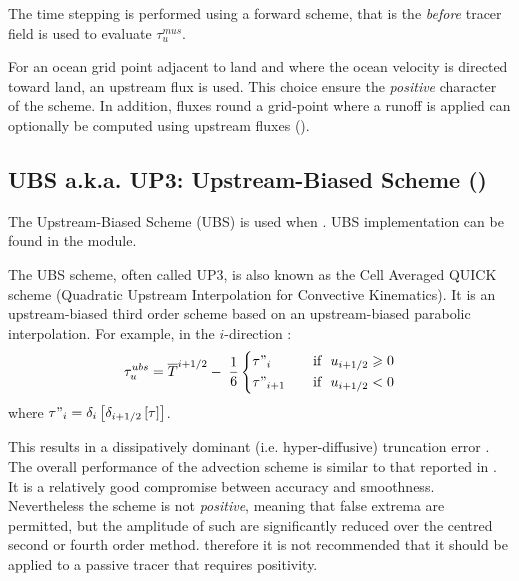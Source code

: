 \documentclass[../tex_main/NEMO_manual]{subfiles}
\begin{document}
The time stepping is performed using a forward scheme, that is the \textit{before} 
tracer field is used to evaluate $\tau _u^{mus}$.

For an ocean grid point adjacent to land and where the ocean velocity is 
directed toward land, an upstream flux is used. This choice ensure 
the \textit{positive} character of the scheme. 
In addition, fluxes round a grid-point where a runoff is applied can optionally be 
computed using upstream fluxes ().

\subsection{UBS a.k.a. UP3: Upstream-Biased Scheme (\protect{})}
\label{subsec:TRA_adv_ubs}

The Upstream-Biased Scheme (UBS) is used when . 
UBS implementation can be found in the  module.

The UBS scheme, often called UP3, is also known as the Cell Averaged QUICK scheme 
(Quadratic Upstream Interpolation for Convective Kinematics). It is an upstream-biased 
third order scheme based on an upstream-biased parabolic interpolation.  
For example, in the $i$-direction :
\begin{equation} \label{eq:tra_adv_ubs}
   \tau _u^{ubs} =\overline T ^{i+1/2}-\;\frac{1}{6} \left\{      
   \begin{aligned}
         &\tau"_i        	& \quad \text{if }\ u_{i+1/2} \geqslant 0      \\
         &\tau"_{i+1}	& \quad \text{if }\ u_{i+1/2}       <       0
   \end{aligned}    \right.
\end{equation}
where $\tau "_i =\delta _i \left[ {\delta _{i+1/2} \left[ \tau \right]} \right]$.

This results in a dissipatively dominant (i.e. hyper-diffusive) truncation 
error \citep{Shchepetkin_McWilliams_OM05}. The overall performance of
 the advection scheme is similar to that reported in \cite{Farrow1995}. 
It is a relatively good compromise between accuracy and smoothness. 
Nevertheless the scheme is not \emph{positive}, meaning that false extrema are permitted, 
but the amplitude of such are significantly reduced over the centred second 
or fourth order method. therefore it is not recommended that it should be 
applied to a passive tracer that requires positivity. 
\end{document}
